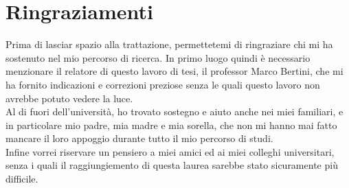 \chapter{Ringraziamenti}\label{ch:ringraziamenti}
Prima di lasciar spazio alla trattazione, permettetemi di ringraziare chi mi ha sostenuto nel mio percorso di ricerca. In primo luogo quindi è necessario menzionare il relatore di questo lavoro di tesi, il professor Marco Bertini, che mi ha fornito indicazioni e correzioni preziose senza le quali questo lavoro non avrebbe potuto vedere la luce.
\\Al di fuori dell’università, ho trovato sostegno e aiuto anche nei miei familiari, e in particolare mio padre, mia madre e mia sorella, che non mi hanno mai fatto mancare il loro appoggio durante tutto il mio percorso di studi.
\\Infine vorrei riservare un pensiero a miei amici ed ai miei colleghi universitari, senza i quali il raggiungiemento di questa laurea sarebbe stato sicuramente più difficile.